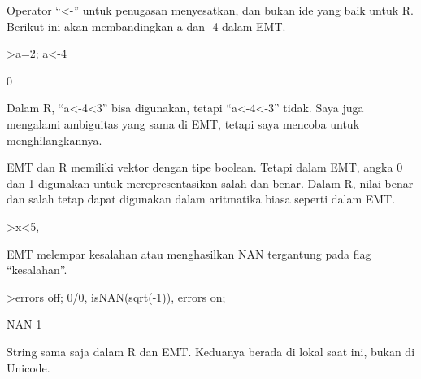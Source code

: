 \documentclass[a4paper,10pt]{article}
\begin{document}
\begin{eulernotebook}
\begin{eulercomment}
\begin{eulercomment}
\begin{eulercomment}
\begin{eulercomment}
\begin{eulercomment}
\begin{eulercomment}
\begin{eulercomment}
\begin{eulercomment}
\begin{eulercomment}
\begin{eulercomment}
\begin{eulercomment}
\begin{eulercomment}
\begin{eulercomment}
\begin{eulercomment}
\begin{eulercomment}
\begin{eulercomment}
\begin{eulercomment}
\begin{eulercomment}
\begin{eulercomment}
\begin{eulercomment}
\begin{eulercomment}
\begin{eulercomment}
\begin{eulercomment}
Operator “\textless{}-” untuk penugasan menyesatkan, dan bukan ide yang baik
untuk R. Berikut ini akan membandingkan a dan -4 dalam EMT.
\end{eulercomment}
\begin{eulerprompt}
>a=2; a<-4
\end{eulerprompt}
\begin{euleroutput}
  0
\end{euleroutput}
\begin{eulercomment}
Dalam R, “a\textless{}-4\textless{}3” bisa digunakan, tetapi “a\textless{}-4\textless{}-3” tidak. Saya juga
mengalami ambiguitas yang sama di EMT, tetapi saya mencoba untuk
menghilangkannya.

EMT dan R memiliki vektor dengan tipe boolean. Tetapi dalam EMT, angka
0 dan 1 digunakan untuk merepresentasikan salah dan benar. Dalam R,
nilai benar dan salah tetap dapat digunakan dalam aritmatika biasa
seperti dalam EMT.
\end{eulercomment}
\begin{eulerprompt}
>x<5, %
\end{eulerprompt}
\begin{euleroutput}
  [0,  0,  1,  0,  0]
  [0,  0,  3.1,  0,  0]
\end{euleroutput}
\begin{eulercomment}
EMT melempar kesalahan atau menghasilkan NAN tergantung pada flag
“kesalahan”.
\end{eulercomment}
\begin{eulerprompt}
>errors off; 0/0, isNAN(sqrt(-1)), errors on;
\end{eulerprompt}
\begin{euleroutput}
  NAN
  1
\end{euleroutput}
\begin{eulercomment}
String sama saja dalam R dan EMT. Keduanya berada di lokal saat ini,
bukan di Unicode.


\end{eulercomment}
\end{eulercomment}
\end{eulercomment}
\end{eulercomment}
\end{eulercomment}
\end{eulercomment}
\end{eulercomment}
\end{eulercomment}
\end{eulercomment}
\end{eulercomment}
\end{eulercomment}
\end{eulercomment}
\end{eulercomment}
\end{eulercomment}
\end{eulercomment}
\end{eulercomment}
\end{eulercomment}
\end{eulercomment}
\end{eulercomment}
\end{eulercomment}
\end{eulercomment}
\end{eulercomment}
\end{eulercomment}
\end{eulernotebook}
\end{document}
